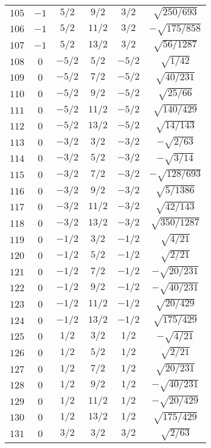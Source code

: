 \begin{table}
\begin{center}
\begin{tabular}{|c|c|c|c|c|c|}
$105$ & $-1$ & $5/2$ & $9/2$ & $3/2$ & $\sqrt{250/693}$ \\ 
$106$ & $-1$ & $5/2$ & $11/2$ & $3/2$ & $-\sqrt{175/858}$ \\ 
$107$ & $-1$ & $5/2$ & $13/2$ & $3/2$ & $\sqrt{56/1287}$ \\ 
$108$ & $0$ & $-5/2$ & $5/2$ & $-5/2$ & $\sqrt{1/42}$ \\ 
$109$ & $0$ & $-5/2$ & $7/2$ & $-5/2$ & $\sqrt{40/231}$ \\ 
$110$ & $0$ & $-5/2$ & $9/2$ & $-5/2$ & $\sqrt{25/66}$ \\ 
$111$ & $0$ & $-5/2$ & $11/2$ & $-5/2$ & $\sqrt{140/429}$ \\ 
$112$ & $0$ & $-5/2$ & $13/2$ & $-5/2$ & $\sqrt{14/143}$ \\ 
$113$ & $0$ & $-3/2$ & $3/2$ & $-3/2$ & $-\sqrt{2/63}$ \\ 
$114$ & $0$ & $-3/2$ & $5/2$ & $-3/2$ & $-\sqrt{3/14}$ \\ 
$115$ & $0$ & $-3/2$ & $7/2$ & $-3/2$ & $-\sqrt{128/693}$ \\ 
$116$ & $0$ & $-3/2$ & $9/2$ & $-3/2$ & $\sqrt{5/1386}$ \\ 
$117$ & $0$ & $-3/2$ & $11/2$ & $-3/2$ & $\sqrt{42/143}$ \\ 
$118$ & $0$ & $-3/2$ & $13/2$ & $-3/2$ & $\sqrt{350/1287}$ \\ 
$119$ & $0$ & $-1/2$ & $3/2$ & $-1/2$ & $\sqrt{4/21}$ \\ 
$120$ & $0$ & $-1/2$ & $5/2$ & $-1/2$ & $\sqrt{2/21}$ \\ 
$121$ & $0$ & $-1/2$ & $7/2$ & $-1/2$ & $-\sqrt{20/231}$ \\ 
$122$ & $0$ & $-1/2$ & $9/2$ & $-1/2$ & $-\sqrt{40/231}$ \\ 
$123$ & $0$ & $-1/2$ & $11/2$ & $-1/2$ & $\sqrt{20/429}$ \\ 
$124$ & $0$ & $-1/2$ & $13/2$ & $-1/2$ & $\sqrt{175/429}$ \\ 
$125$ & $0$ & $1/2$ & $3/2$ & $1/2$ & $-\sqrt{4/21}$ \\ 
$126$ & $0$ & $1/2$ & $5/2$ & $1/2$ & $\sqrt{2/21}$ \\ 
$127$ & $0$ & $1/2$ & $7/2$ & $1/2$ & $\sqrt{20/231}$ \\ 
$128$ & $0$ & $1/2$ & $9/2$ & $1/2$ & $-\sqrt{40/231}$ \\ 
$129$ & $0$ & $1/2$ & $11/2$ & $1/2$ & $-\sqrt{20/429}$ \\ 
$130$ & $0$ & $1/2$ & $13/2$ & $1/2$ & $\sqrt{175/429}$ \\ 
$131$ & $0$ & $3/2$ & $3/2$ & $3/2$ & $\sqrt{2/63}$ \\ 

\end{tabular}
\end{center}
\end{table}
